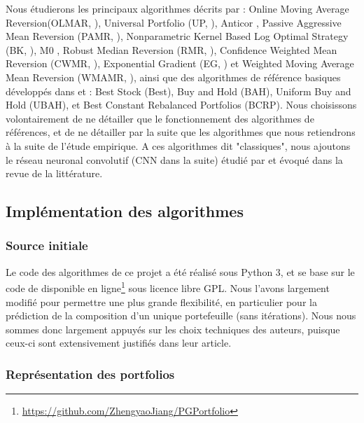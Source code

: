 \documentclass[a4paper, 10pt]{article}
\begin{document}
Nous étudierons les principaux algorithmes décrits par \citet{Li2014} : Online Moving Average Reversion(OLMAR, \cite{Li2015}), Universal Portfolio (UP, \cite{Cover1991}), Anticor \cite{Borodin2004}, Passive Aggressive Mean Reversion (PAMR, \cite{Li2012}), Nonparametric Kernel Based Log Optimal Strategy (BK, \cite{Gyorfi2006}), M0 \cite{Borodin2000}, Robust Median Reversion (RMR, \cite{Huang2013}), Confidence Weighted Mean Reversion (CWMR, \cite{Li2013}), Exponential Gradient (EG, \cite{Helmbold1998}) et Weighted Moving Average Mean Reversion (WMAMR, \cite{Gao2013}), ainsi que des algorithmes de référence basiques développés dans \cite{Cover1986} et \cite{Cover1991} : Best Stock (Best), Buy and Hold (BAH), Uniform Buy and Hold (UBAH), et Best Constant Rebalanced Portfolios (BCRP). Nous choisissons volontairement de ne détailler que le fonctionnement des algorithmes de références, et de ne détailler par la suite que les algorithmes que nous retiendrons à la suite de l'étude empirique. A ces algorithmes dit "classiques", nous ajoutons le réseau neuronal convolutif (CNN dans la suite) étudié par \citet{Jiang2017} et évoqué dans la revue de la littérature.

\subsection{Implémentation des algorithmes}

\subsubsection{Source initiale}

Le code des algorithmes de ce projet a été réalisé sous Python 3, et se base sur le code de \citet{Jiang2017} disponible en ligne\footnote{\url{https://github.com/ZhengyaoJiang/PGPortfolio}} sous licence libre GPL. Nous l'avons largement modifié pour permettre une plus grande flexibilité, en particulier pour la prédiction de la composition d'un unique portefeuille (sans itérations). Nous nous sommes donc largement appuyés sur les choix techniques des auteurs, puisque ceux-ci sont extensivement justifiés dans leur article.

\subsubsection{Représentation des portfolios}
\end{document}
